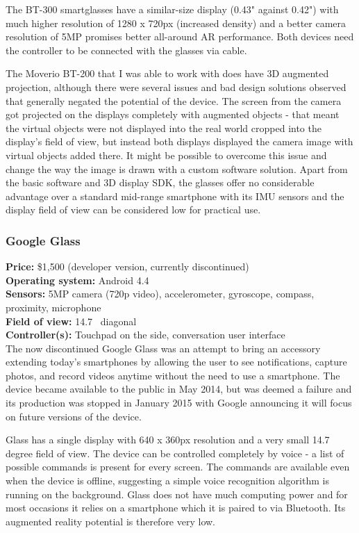\documentclass[12pt, a4paper]{article}
\begin{document}
The BT-300 smartglasses have a similar-size display (0.43" against 0.42") with much higher resolution of 1280 x 720px (increased density) and a better camera resolution of 5MP promises better all-around AR performance. Both devices need the controller to be connected with the glasses via cable.

The Moverio BT-200 that I was able to work with does have 3D augmented projection, although there were several issues and bad design solutions observed that generally negated the potential of the device. The screen from the camera got projected on the displays completely with augmented objects - that meant the virtual objects were not displayed into the real world cropped into the display’s field of view, but instead both displays displayed the camera image with virtual objects added there. It might be possible to overcome this issue and change the way the image is drawn with a custom software solution. Apart from the basic software and 3D display SDK, the glasses offer no considerable advantage over a standard mid-range smartphone with its IMU sensors and the display field of view can be considered low for practical use.

\subsubsection{Google Glass}
\vspace*{-5mm}
\textbf{Price:} \$1,500 (developer version, currently discontinued)\\
\textbf{Operating system:} Android 4.4\\
\textbf{Sensors:} 5MP camera (720p video), accelerometer, gyroscope, compass, proximity, microphone\\
\textbf{Field of view:} 14.7\degree~ diagonal\\
\textbf{Controller(s):} Touchpad on the side, conversation user interface \bigskip \\
The now discontinued Google Glass was an attempt to bring an accessory extending today’s smartphones by allowing the user to see notifications, capture photos, and record videos anytime without the need to use a smartphone. The device became available to the public in May 2014, but was deemed a failure and its production was stopped in January 2015 with Google announcing it will focus on future versions of the device.

Glass has a single display with 640 x 360px resolution and a very small 14.7 degree field of view. The device can be controlled completely by voice - a list of possible commands is present for every screen. The commands are available even when the device is offline, suggesting a simple voice recognition algorithm is running on the background. Glass does not have much computing power and for most occasions it relies on a smartphone which it is paired to via Bluetooth. Its augmented reality potential is therefore very low.
\end{document}
